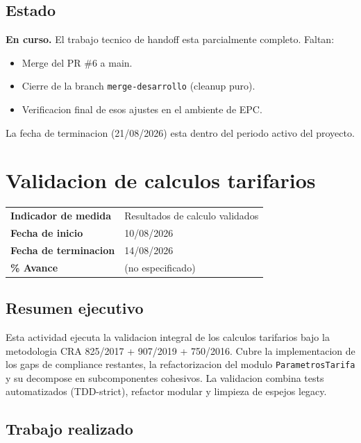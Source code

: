 \documentclass[11pt,a4paper,oneside]{report}
\begin{document}
\section{Estado}

\textbf{En curso.} El trabajo tecnico de handoff esta parcialmente completo. Faltan:
\begin{itemize}[leftmargin=*]
    \item Merge del PR \#6 a main.
    \item Cierre de la branch \texttt{merge-desarrollo} (cleanup puro).
    \item Verificacion final de esos ajustes en el ambiente de EPC.
\end{itemize}

La fecha de terminacion (21/08/2026) esta dentro del periodo activo del proyecto.


\chapter{Validacion de calculos tarifarios}

\begin{tabularx}{\textwidth}{L{4cm} X}
\toprule
\textbf{Indicador de medida} & Resultados de calculo validados \\
\textbf{Fecha de inicio} & 10/08/2026 \\
\textbf{Fecha de terminacion} & 14/08/2026 \\
\textbf{\% Avance} & (no especificado) \\
\bottomrule
\end{tabularx}

\section{Resumen ejecutivo}

Esta actividad ejecuta la validacion integral de los calculos tarifarios bajo la metodologia CRA 825/2017 + 907/2019 + 750/2016. Cubre la implementacion de los gaps de compliance restantes, la refactorizacion del modulo \texttt{ParametrosTarifa} y su decompose en subcomponentes cohesivos. La validacion combina tests automatizados (TDD-strict), refactor modular y limpieza de espejos legacy.

\section{Trabajo realizado}
\end{document}
